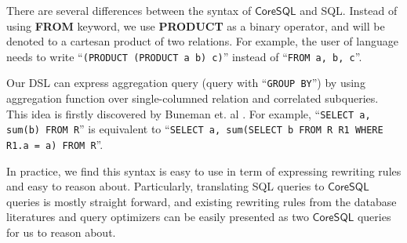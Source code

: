 There are several differences between the syntax of $\mathsf{CoreSQL}$ and SQL. Instead of using \textbf{FROM} keyword, we use \textbf{PRODUCT} as a binary operator, and will be denoted to a cartesan product of two relations. For example, the user of language needs to write ``\lstinline[style=sql, keywords={}]{(PRODUCT (PRODUCT a b) c)}'' instead of ``\lstinline[style=sql, keywords={}]{FROM a, b, c}''.  

Our DSL can express aggregation query (query with ``\lstinline[style=sql, keywords={}]{GROUP BY}'') by
using aggregation function over single-columned relation and correlated subqueries. This idea is firstly discovered by Buneman et. al \cite{comp_syntax}. For example, ``\lstinline[style=sql, keywords={}]{SELECT a, sum(b) FROM R}'' 
is equivalent to ``\lstinline[style=sql, keywords={}]{SELECT a, sum(SELECT b FROM R R1 WHERE R1.a = a) FROM R}''.


In practice, we find this syntax is easy to use in term of expressing 
rewriting rules and easy to reason about. Particularly, translating SQL queries to $\mathsf{CoreSQL}$ queries is mostly straight forward, and existing rewriting rules from the database 
literatures and query optimizers can be easily presented as two $\mathsf{CoreSQL}$ queries for us to reason about.

